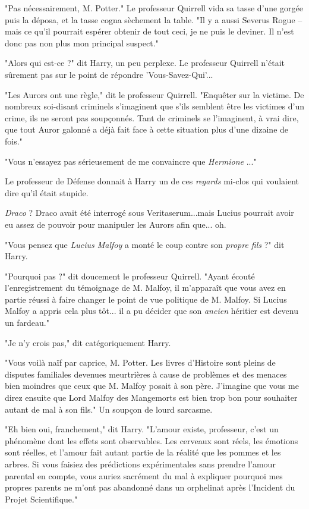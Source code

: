 "Pas nécessairement, M. Potter." Le professeur Quirrell vida sa tasse d'une gorgée puis la déposa, et la tasse cogna sèchement la table. "Il y a aussi Severus Rogue – mais ce qu'il pourrait espérer obtenir de tout ceci, je ne puis le deviner. Il n'est donc pas non plus mon principal suspect."

"Alors qui est-ce ?" dit Harry, un peu perplexe. Le professeur Quirrell n'était sûrement pas sur le point de répondre 'Vous-Savez-Qui'...

"Les Aurors ont une règle," dit le professeur Quirrell. "Enquêter sur la victime. De nombreux soi-disant criminels s'imaginent que s'ils semblent être les victimes d'un crime, ils ne seront pas soupçonnés. Tant de criminels se l'imaginent, à vrai dire, que tout Auror galonné a déjà fait face à cette situation plus d'une dizaine de fois."

"Vous n'essayez pas sérieusement de me convaincre que \emph{Hermione} ..."

Le professeur de Défense donnait à Harry un de ces \emph{regards}  mi-clos qui voulaient dire qu'il était stupide.

\emph{Draco}  ? Draco avait été interrogé sous Veritaserum...mais Lucius pourrait avoir eu assez de pouvoir pour manipuler les Aurors afin que... oh.

"Vous pensez que \emph{Lucius Malfoy}  a monté le coup contre son \emph{propre fils}  ?" dit Harry.

"Pourquoi pas ?" dit doucement le professeur Quirrell. "Ayant écouté l'enregistrement du témoignage de M. Malfoy, il m'apparaît que vous avez en partie réussi à faire changer le point de vue politique de M. Malfoy. Si Lucius Malfoy a appris cela plus tôt... il a pu décider que son \emph{ancien}  héritier est devenu un fardeau."

"Je n'y crois pas," dit catégoriquement Harry.

"Vous voilà naïf par caprice, M. Potter. Les livres d'Histoire sont pleins de disputes familiales devenues meurtrières à cause de problèmes et des menaces bien moindres que ceux que M. Malfoy posait à son père. J'imagine que vous me direz ensuite que Lord Malfoy des Mangemorts est bien trop bon pour souhaiter autant de mal à son fils." Un soupçon de lourd sarcasme.

"Eh bien oui, franchement," dit Harry. "L'amour existe, professeur, c'est un phénomène dont les effets sont observables. Les cerveaux sont réels, les émotions sont réelles, et l'amour fait autant partie de la réalité que les pommes et les arbres. Si vous faisiez des prédictions expérimentales sans prendre l'amour parental en compte, vous auriez sacrément du mal à expliquer pourquoi mes propres parents ne m'ont pas abandonné dans un orphelinat après l'Incident du Projet Scientifique."

